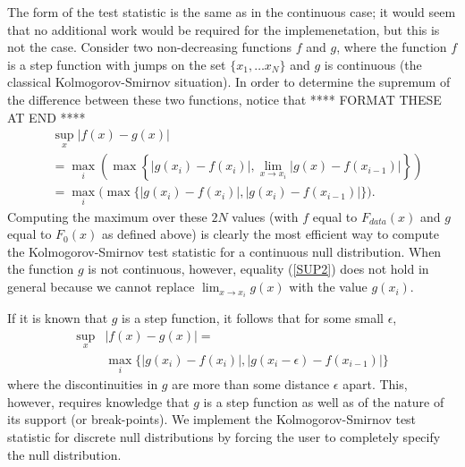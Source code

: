 The form of the test statistic is the same as in the
continuous case; it would seem that no additional work would be required
for the implemenetation, but this is not the case.
Consider two non-decreasing functions $f$ and $g$, where the function $f$ is a step function with jumps on the set $\{x_1, \ldots x_N \}$ and $g$
is continuous (the classical Kolmogorov-Smirnov situation).
In order to determine the supremum of the difference between
these two functions, notice that **** FORMAT THESE AT END ****
\begin{align}
&\sup_x \left| f(x)- g(x) \right|  \nonumber  \\
       &= \max_i \left( \max\left\{ \left|g(x_i) - f(x_i) \right|, \lim_{x \rightarrow x_i} \left| g(x) - f(x_{i-1}) \right| \right\} \right) \label{SUP1}\\
&=  \max_i \bigg(\max \bigg\{ \left|g(x_i) - f(x_i) \right|, \left| g(x_i) - f(x_{i-1}) \right| \bigg\} \bigg). \label{SUP2}
\end{align}
Computing the maximum over these $2N$
values (with $f$ equal to
$F_{data}(x)$ and $g$ equal to $F_0(x)$ as defined above) is clearly the 
most efficient way to compute the Kolmogorov-Smirnov test statistic for
a continuous null distribution. When the function $g$ is not
continuous, however, equality (\ref{SUP2}) does not hold in general because 
we cannot replace $\lim_{x\rightarrow x_i} g(x)$ with the value $g(x_i)$. 

If it is known that $g$ is a step function, it follows that
for some small $\epsilon$,
\begin{align}
\sup_x &\left| f(x)- g(x) \right| =  \nonumber \\
        &                    \max_i \{ \left|g(x_i) - f(x_i) \right|, \left| g(x_i - \epsilon) - f(x_{i-1}) \right| \} \label{epsilon}
\end{align}
where the discontinuities in $g$ are more than some distance $\epsilon$ apart. 
This, however, requires knowledge that $g$ is a step function as well as of
the nature of its support (or break-points).
%
%
We implement the Kolmogorov-Smirnov test statistic for discrete null
distributions by forcing the user to completely specify the null distribution.

